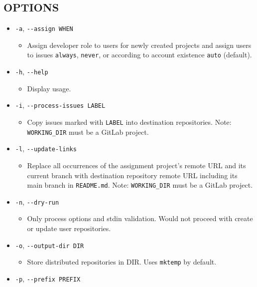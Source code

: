 \subsection{OPTIONS}\label{options-2}

\begin{itemize}
\item
  \texttt{-a}, \texttt{-\/-assign\ WHEN}

  \begin{itemize}
  \item
    Assign developer role to users for newly created projects and assign users to issues \texttt{always}, \texttt{never}, or according to account existence \texttt{auto} (default).
  \end{itemize}
\item
  \texttt{-h}, \texttt{-\/-help}

  \begin{itemize}
  \item
    Display usage.
  \end{itemize}
\item
  \texttt{-i}, \texttt{-\/-process-issues\ LABEL}

  \begin{itemize}
  \item
    Copy issues marked with \texttt{LABEL} into destination repositories. Note: \\ \texttt{WORKING\_DIR} must be a GitLab project.
  \end{itemize}
\item
  \texttt{-l}, \texttt{-\/-update-links}

  \begin{itemize}
  \item
    Replace all occurrences of the assignment project's remote URL and its current branch with destination repository remote URL including its main branch in \texttt{README.md}. Note: \texttt{WORKING\_DIR} must be a GitLab project.
  \end{itemize}
\item
  \texttt{-n}, \texttt{-\/-dry-run}

  \begin{itemize}
  \item
    Only process options and stdin validation. Would not proceed with create or update user repositories.
  \end{itemize}
\item
  \texttt{-o}, \texttt{-\/-output-dir\ DIR}

  \begin{itemize}
  \item
    Store distributed repositories in DIR. Uses \texttt{mktemp} by default.
  \end{itemize}
\item
  \texttt{-p}, \texttt{-\/-prefix\ PREFIX}


\end{itemize}
